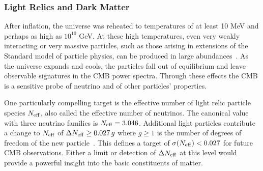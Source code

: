 
\vspace{-0.15in}

\subsubsection{Light Relics and Dark Matter}

\vspace{-0.05in}

After inflation, the universe was reheated to temperatures of at least 10 MeV and perhaps as high as $10^{10}$ GeV.  
At these high temperatures, even very weakly interacting or very massive particles, such as those arising 
in extensions of the Standard model of particle physics, can be produced in large abundances~\cite{1979ARNPS..29..313S,Bolz:2000fu}.  As the universe expands and cools, 
the particles fall out of equilibrium and leave observable signatures in the \ac{CMB} power spectra. 
Through these effects the CMB is a sensitive probe of neutrino and of other particles' properties.  

One particularly compelling target is the effective number of light relic particle species ${N_{\rm eff}}$, also called the effective 
number of neutrinos. The canonical value with three neutrino families is ${N_{\rm eff}} = 3.046$. Additional light particles 
contribute a change to ${N_{\rm eff}}$ of $\Delta {N_{\rm eff}} \geq 0.027\,g$ where $g \geq 1$ is the number of 
degrees of freedom of the new particle~\cite{Brust:2013xpv,Baumann:2016wac}.  
This defines a target of $\sigma({N_{\rm eff}}) < 0.027$ for future CMB observations. 
Either a limit or detection of $\Delta {N_{\rm eff}}$ at this level would provide a powerful insight into the basic constituents 
of matter. 

